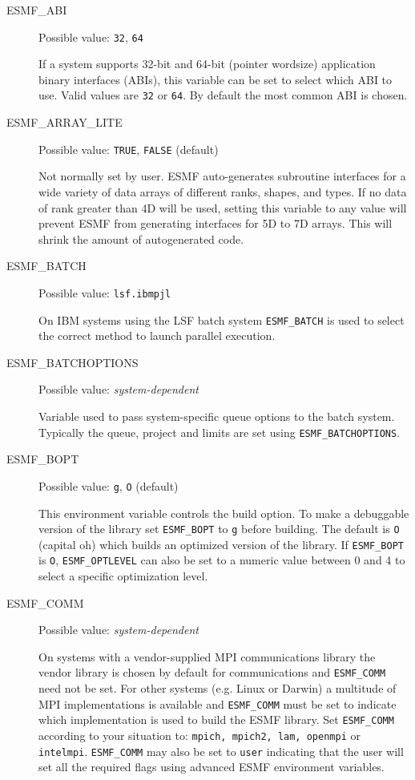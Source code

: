 \begin{description}

\item[ESMF\_ABI]
Possible value: {\tt 32}, {\tt 64}

If a system supports 32-bit and 64-bit (pointer wordsize) application binary
interfaces (ABIs), this variable can be set to select which ABI to use. Valid 
values are {\tt 32} or {\tt 64}. By default the most common ABI is chosen.

\item[ESMF\_ARRAY\_LITE]
Possible value: {\tt TRUE}, {\tt FALSE} (default)

Not normally set by user. ESMF auto-generates subroutine interfaces for a wide
variety of data arrays of different ranks, shapes, and types. If no data of
rank greater than 4D will be used, setting this variable to any value will
prevent ESMF from generating interfaces for 5D to 7D arrays. This will
shrink the amount of autogenerated code.

\item[ESMF\_BATCH]
Possible value: {\tt lsf.ibmpjl}

On IBM systems using the LSF batch system {\tt ESMF\_BATCH} is used to select
the correct method to launch parallel execution.

\item[ESMF\_BATCHOPTIONS]
Possible value: {\em system-dependent}

Variable used to pass system-specific queue options to the batch system. 
Typically the queue, project and limits are set using {\tt ESMF\_BATCHOPTIONS}.

\item[ESMF\_BOPT] 
Possible value: {\tt g}, {\tt O} (default)

This environment variable controls the build option. To make a debuggable
version of the library set {\tt ESMF\_BOPT} to {\tt g} before building. The 
default is {\tt O} (capital oh) which builds an optimized version of the
library. If {\tt ESMF\_BOPT} is {\tt O}, {\tt ESMF\_OPTLEVEL} can also be set
to a numeric value between 0 and 4 to select a specific optimization level.

\item[ESMF\_COMM]
Possible value: {\em system-dependent}

On systems with a vendor-supplied MPI communications library the vendor library 
is chosen by default for communications and {\tt ESMF\_COMM} need not be set.
For other systems (e.g. Linux or Darwin) a multitude of MPI implementations is
available and {\tt ESMF\_COMM} must be set to indicate which implementation is
used to build the ESMF library. Set {\tt ESMF\_COMM} according to your situation
to: {\tt mpich, mpich2, lam, openmpi} or {\tt intelmpi}. {\tt ESMF\_COMM} may
also be set to {\tt user} indicating that the user will set all the required
flags using advanced ESMF environment variables.


\end{description}
